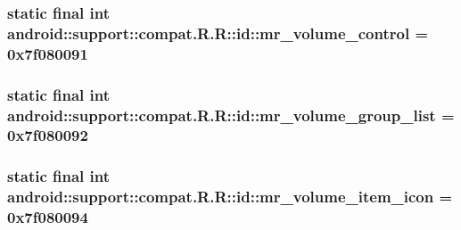\hypertarget{classandroid_1_1support_1_1compat_1_1_r_1_1id_164964728a705978f1cab010900e551f}{
\subsubsection[{mr\_\-volume\_\-control}]{\setlength{\rightskip}{0pt plus 5cm}static final int android::support::compat.R.R::id::mr\_\-volume\_\-control = 0x7f080091}}
\label{classandroid_1_1support_1_1compat_1_1_r_1_1id_164964728a705978f1cab010900e551f}


\hypertarget{classandroid_1_1support_1_1compat_1_1_r_1_1id_321403726ce70f5a4f2e2ca4e4f99e7f}{
\subsubsection[{mr\_\-volume\_\-group\_\-list}]{\setlength{\rightskip}{0pt plus 5cm}static final int android::support::compat.R.R::id::mr\_\-volume\_\-group\_\-list = 0x7f080092}}
\label{classandroid_1_1support_1_1compat_1_1_r_1_1id_321403726ce70f5a4f2e2ca4e4f99e7f}


\hypertarget{classandroid_1_1support_1_1compat_1_1_r_1_1id_425f75f566c18a0f8cdf44150b02627b}{
\subsubsection[{mr\_\-volume\_\-item\_\-icon}]{\setlength{\rightskip}{0pt plus 5cm}static final int android::support::compat.R.R::id::mr\_\-volume\_\-item\_\-icon = 0x7f080094}}
\label{classandroid_1_1support_1_1compat_1_1_r_1_1id_425f75f566c18a0f8cdf44150b02627b}


